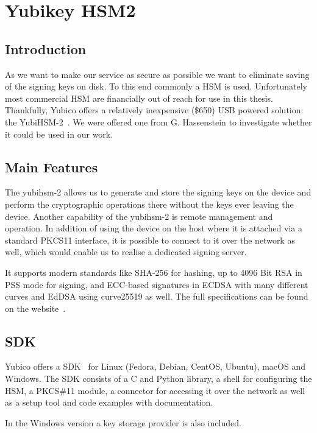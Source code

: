 \chapter{Yubikey HSM2}\label{ch:yubikey-hsm2}

\section{Introduction}\label{sec:yubiintroduction}
As we want to make our service as secure as possible we want to eliminate saving of the signing keys on disk.
To this end commonly a \gls{HSM} is used.
Unfortunately most commercial \gls{HSM} are financially out of reach for use in this thesis.
Thankfully, Yubico offers a relatively inexpensive (\$650) \gls{USB} powered solution: the YubiHSM-2~\cite{yubihsm}.
We were offered one from G. Hassenstein to investigate whether it could be used in our work.

\section{Main Features}\label{sec:technical-specification}
The yubihsm-2 allows us to generate and store the signing keys on the device and perform the cryptographic operations there without the keys ever leaving the device.
Another capability of the yubihsm-2 is remote management and operation.
In addition of using the device on the host where it is attached via a standard \gls{PKCS11} interface,
it is possible to connect to it over the network as well,
which would enable us to realise a dedicated signing server.

It supports modern standards like \gls{SHA-256} for hashing, up to 4096 Bit \gls{RSA} in \gls{PSS} mode for signing,
and \gls{ECC}-based signatures in \gls{ECDSA} with many different curves and \gls{EdDSA} using curve25519 as well.
The full specifications can be found on the website~\cite{yubihsm}.

\section{SDK}\label{sec:sdk}
Yubico offers a \gls{SDK}~\cite{yubihsm} for Linux (Fedora, Debian, CentOS, Ubuntu), macOS and Windows.
The \gls{SDK} consists of a C and Python library, a shell for configuring the \gls{HSM},
a \gls{PKCS}\#11 module,
a connector for accessing it over the network as well as a setup tool and code examples with documentation.

In the Windows version a key storage provider is also included.

